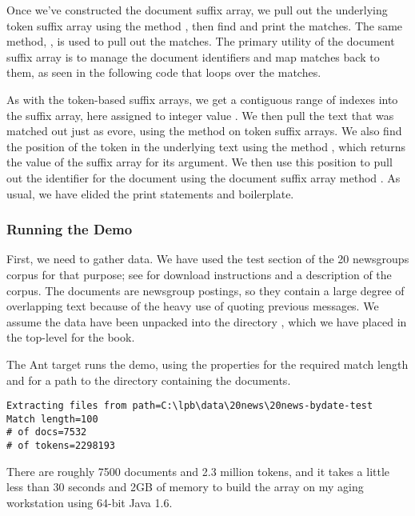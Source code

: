 Once we've constructed the document suffix array, we pull out the
underlying token suffix array using the method ,
then find and print the matches.
%
%
The same method, , is used to pull out
the matches.  The primary utility of the document suffix array is
to manage the document identifiers and map matches back to them,
as seen in the following code that loops over the matches. 

As with the token-based suffix arrays, we get a contiguous range
of indexes into the suffix array, here assigned to integer value
.  We then pull the text that was matched out just as evore,
using the  method on token suffix arrays.  We also
find the position of the token in the underlying text using the
method , which returns the value of the suffix
array for its argument.  We then use this position to pull out
the identifier for the document using the document suffix array
method .  As usual, we have elided
the print statements and boilerplate.


\subsubsection{Running the Demo}

First, we need to gather data.  We have used the test section of the
20 newsgroups corpus for that purpose; see
 for download instructions and a
description of the corpus.  The documents are newsgroup postings, so
they contain a large degree of overlapping text because of the heavy
use of quoting previous messages.  We assume the data have been
unpacked into the directory , which
we have placed in the top-level for the book.

The Ant target  runs the demo, using the properties
 for the required match length and  for a path
to the directory containing the documents.
%
\begin{verbatim}
Extracting files from path=C:\lpb\data\20news\20news-bydate-test
Match length=100
# of docs=7532
# of tokens=2298193
\end{verbatim}
%
There are roughly 7500 documents and 2.3 million tokens, and it takes
a little less than 30 seconds and 2GB of memory to build the array on
my aging workstation using 64-bit Java 1.6.

